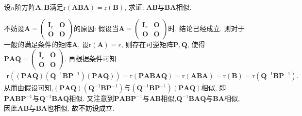 \documentclass[../../main.tex]{subfiles}%
\begin{document}
\begin{example}
设\(n\)阶方阵\(\boldsymbol{A},\boldsymbol{B}\)满足\(\mathrm{r}(\boldsymbol{ABA})=\mathrm{r}(\boldsymbol{B})\), 求证: \(\boldsymbol{AB}\)与\(\boldsymbol{BA}\)相似.
\end{example}
\begin{remark}
不妨设\(\boldsymbol{A}=\begin{pmatrix}\boldsymbol{I}_{r}&\boldsymbol{O}\\\boldsymbol{O}&\boldsymbol{O}\end{pmatrix}\)的原因: 假设当\(\boldsymbol{A}=\begin{pmatrix}\boldsymbol{I}_{r}&\boldsymbol{O}\\\boldsymbol{O}&\boldsymbol{O}\end{pmatrix}\)时, 结论已经成立. 则对于一般的满足条件的矩阵\(\boldsymbol{A}\), 设\(\mathrm{r}(\boldsymbol{A}) = r\), 则存在可逆矩阵\(\boldsymbol{P},\boldsymbol{Q}\), 使得\(\boldsymbol{PAQ}=\begin{pmatrix}\boldsymbol{I}_{r}&\boldsymbol{O}\\\boldsymbol{O}&\boldsymbol{O}\end{pmatrix}\). 再根据条件可知
\begin{align*}
\mathrm{r}((\boldsymbol{PAQ})(\boldsymbol{Q}^{-1}\boldsymbol{BP}^{-1})(\boldsymbol{PAQ}))=\mathrm{r}(\boldsymbol{PABAQ})=\mathrm{r}(\boldsymbol{ABA})=\mathrm{r}(\boldsymbol{B})=\mathrm{r}(\boldsymbol{Q}^{-1}\boldsymbol{BP}^{-1}).
\end{align*}
从而由假设可知,\((\boldsymbol{PAQ})(\boldsymbol{Q}^{-1}\boldsymbol{BP}^{-1})\)与\((\boldsymbol{Q}^{-1}\boldsymbol{BP}^{-1})(\boldsymbol{PAQ})\)相似, 即\(\boldsymbol{PABP}^{-1}\)与\(\boldsymbol{Q}^{-1}\boldsymbol{BAQ}\)相似. 又注意到\(\boldsymbol{PABP}^{-1}\)与\(\boldsymbol{AB}\)相似,\(\boldsymbol{Q}^{-1}\boldsymbol{BAQ}\)与\(\boldsymbol{BA}\)相似, 因此\(\boldsymbol{AB}\)与\(\boldsymbol{BA}\)也相似. 故不妨设成立.
\end{remark}
\end{document}
